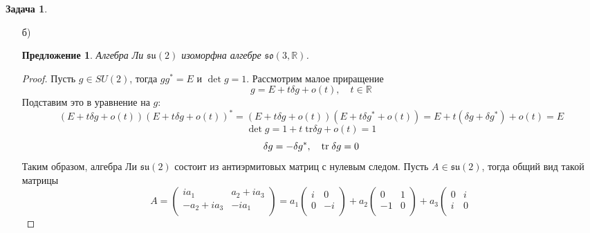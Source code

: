 \documentclass[12pt]{article}
\newtheorem{predl}[theorem]{Предложение}
\theoremstyle{definition}
\newtheorem{zad}{Задача}[section]
\begin{document}
\begin{zad}
\begin{itemize}
\begin{proof}
\begin{equation}
        \end{equation}
    \end{proof}
    \item[б)]
    \begin{predl}
        Алгебра Ли $\mathfrak{su}(2)$ изоморфна алгебре $\mathfrak{so}(3,\mathbb{R})$.
    \end{predl}
    \begin{proof}
        Пусть $g\in SU(2)$, тогда $gg^*=E$ и $\det g=1$. Рассмотрим малое приращение
        \begin{equation}
            g=E+t\delta g+o(t),\quad t\in\mathbb{R}
        \end{equation}
        Подставим это в уравнение на $g$:
        \begin{equation*}
            (E+t\delta g+o(t))(E+t\delta g+o(t))^*=(E+t\delta g+o(t))(E+t\delta g^*+o(t))=E+t(\delta g+\delta g^*)+o(t)=E
        \end{equation*}
        \begin{equation}
            \det g=1+t\;\text{tr}\delta g+o(t)=1
        \end{equation}
        \begin{equation}
            \delta g=-\delta g^*,\quad \text{tr\;}\delta g=0
        \end{equation}
        Таким образом, алгебра Ли $\mathfrak{su}(2)$ состоит из антиэрмитовых матриц с нулевым следом. Пусть $A\in \mathfrak{su}(2)$, тогда общий вид такой матрицы
        \begin{equation}
            A=\left(
        \begin{array}{cc}
        ia_1 & a_2+ia_3\\
        -a_2+ia_3 & -ia_1\\
        \end{array}
        \right)=a_1\left(
        \begin{array}{cc}
        i & 0\\
        0 & -i\\
        \end{array}
        \right)+a_2\left(
        \begin{array}{cc}
        0 & 1\\
        -1 & 0\\
        \end{array}
        \right)+a_3\left(
        \begin{array}{cc}
        0 & i\\
        i & 0\\

\end{array}
\end{equation}
\end{proof}
\end{itemize}
\end{zad}
\end{document}
